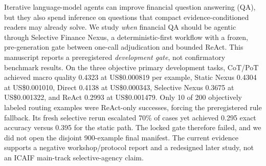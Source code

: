Iterative language-model agents can improve financial question answering (QA), but they also spend inference on questions that compact evidence-conditioned readers may already solve. We study \emph{when} financial QA should be agentic through Selective Finance Nexus, a deterministic-first workflow with a frozen, pre-generation gate between one-call adjudication and bounded ReAct. This manuscript reports a preregistered \emph{development gate}, not confirmatory benchmark results. On the three objective primary development tasks, CoT/PoT achieved macro quality 0.4323 at US\$0.000819 per example, Static Nexus 0.4304 at US\$0.001010, Direct 0.4138 at US\$0.000343, Selective Nexus 0.3675 at US\$0.001322, and ReAct 0.2993 at US\$0.001479. Only 10 of 200 objectively labeled routing examples were ReAct-only successes, forcing the preregistered rule fallback. Its fresh selective rerun escalated 70\% of cases yet achieved 0.295 exact accuracy versus 0.395 for the static path. The locked gate therefore failed, and we did not open the disjoint 900-example final manifest. The current evidence supports a negative workshop/protocol report and a redesigned later study, not an ICAIF main-track selective-agency claim.
